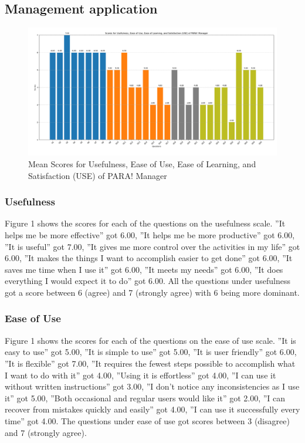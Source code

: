 \documentclass[journal]{./IEEE/IEEEtran}
\begin{document}
\subsection{Management application}
\begin{figure}[h]
    \centering
        \includegraphics[scale=0.18]{./figures/manager means.png}
    \caption{Mean Scores for Usefulness, Ease of Use, Ease of Learning, and Satisfaction (USE) of PARA! Manager}
\end{figure}
\subsubsection{Usefulness}
Figure 1 shows the scores for each of the questions on the usefulness scale.
”It helps me be more effective” got 6.00, ”It helps me be more productive” got 6.00, ”It is useful” got 7.00, ”It gives me more control over the activities in my life” got 6.00, ”It makes the things I want to accomplish easier to get done” got 6.00, ”It saves me time when I use it” got 6.00, ”It meets my needs” got 6.00, ”It does everything I would expect it to do” got 6.00.
All the questions under usefulness got a score between 6 (agree) and 7 (strongly agree) with 6 being more dominant.
\subsubsection{Ease of Use}
Figure 1 shows the scores for each of the questions on the ease of use scale. ”It is easy to use” got 5.00, ”It is simple to use” got 5.00, ”It is user friendly” got 6.00, ”It is flexible” got 7.00, ”It requires the fewest steps possible to accomplish what I want to do with it” got 4.00, ”Using it is effortless” got 4.00, ”I can use it without written instructions” got 3.00, ”I don’t notice any inconsistencies as I use it” got 5.00, ”Both occasional and regular users would like it” got 2.00, ”I can recover from mistakes quickly and easily” got 4.00, ”I can use it successfully every time” got 4.00.
The questions under ease of use got scores between 3 (disagree) and 7 (strongly agree).
\end{document}
